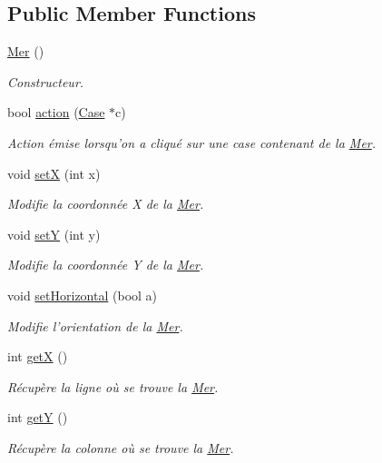 \subsection*{Public Member Functions}
\begin{DoxyCompactItemize}
\item 
\hyperlink{classMer_ace88286368f6f30f2462de952083bcd0}{Mer} ()
\begin{DoxyCompactList}\small\item\em Constructeur. \end{DoxyCompactList}\item 
bool \hyperlink{classMer_aa30fffa94a8e0d5be6ae503aa8392973}{action} (\hyperlink{classCase}{Case} $\ast$c)
\begin{DoxyCompactList}\small\item\em Action émise lorsqu'on a cliqué sur une case contenant de la \hyperlink{classMer}{Mer}. \end{DoxyCompactList}\item 
void \hyperlink{classMer_ab20617d436898cc631fc1842e897de0c}{set\+X} (int x)
\begin{DoxyCompactList}\small\item\em Modifie la coordonnée X de la \hyperlink{classMer}{Mer}. \end{DoxyCompactList}\item 
void \hyperlink{classMer_a13ac62cb31e498d5bcf786d5a0d196ed}{set\+Y} (int y)
\begin{DoxyCompactList}\small\item\em Modifie la coordonnée Y de la \hyperlink{classMer}{Mer}. \end{DoxyCompactList}\item 
void \hyperlink{classMer_a3244c63c7b077ef84e593d9b5e5f4472}{set\+Horizontal} (bool a)
\begin{DoxyCompactList}\small\item\em Modifie l'orientation de la \hyperlink{classMer}{Mer}. \end{DoxyCompactList}\item 
int \hyperlink{classMer_a668a9c3acfa903bb7c8e1d607e1229a4}{get\+X} ()
\begin{DoxyCompactList}\small\item\em Récupère la ligne où se trouve la \hyperlink{classMer}{Mer}. \end{DoxyCompactList}\item 
int \hyperlink{classMer_a41f5d00f824057af9c9b57d666bf6fcc}{get\+Y} ()
\begin{DoxyCompactList}\small\item\em Récupère la colonne où se trouve la \hyperlink{classMer}{Mer}. \end{DoxyCompactList}\item 

\end{DoxyCompactItemize}
